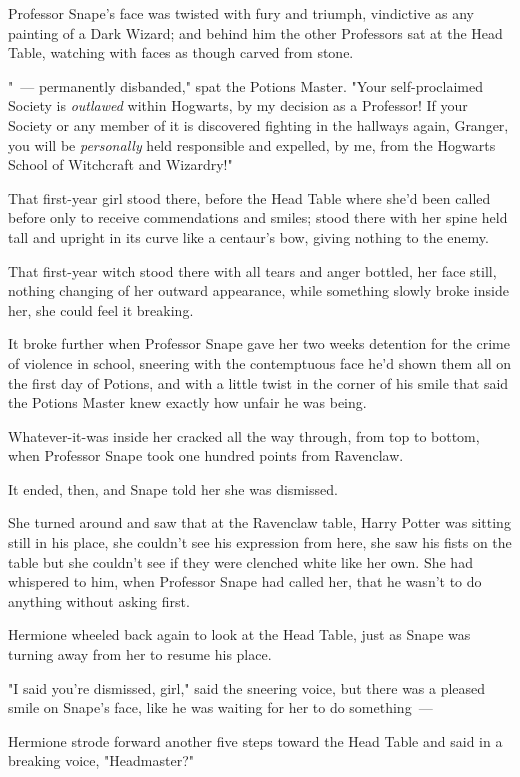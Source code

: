Professor Snape's face was twisted with fury and triumph, vindictive as any
painting of a Dark Wizard; and behind him the other Professors sat at the Head
Table, watching with faces as though carved from stone.

"~--- permanently disbanded," spat the Potions Master. "Your self-proclaimed
Society is \emph{outlawed} within Hogwarts, by my decision as a Professor! If
your Society or any member of it is discovered fighting in the hallways again,
Granger, you will be \emph{personally} held responsible and expelled, by me,
from the Hogwarts School of Witchcraft and Wizardry!"

That first-year girl stood there, before the Head Table where she'd been called
before only to receive commendations and smiles; stood there with her spine
held tall and upright in its curve like a centaur's bow, giving nothing to the
enemy.

That first-year witch stood there with all tears and anger bottled, her face
still, nothing changing of her outward appearance, while something slowly broke
inside her, she could feel it breaking.

It broke further when Professor Snape gave her two weeks detention for the
crime of violence in school, sneering with the contemptuous face he'd shown
them all on the first day of Potions, and with a little twist in the corner of
his smile that said the Potions Master knew exactly how unfair he was being.

Whatever-it-was inside her cracked all the way through, from top to bottom,
when Professor Snape took one hundred points from Ravenclaw.

It ended, then, and Snape told her she was dismissed.

She turned around and saw that at the Ravenclaw table, Harry Potter was sitting
still in his place, she couldn't see his expression from here, she saw his
fists on the table but she couldn't see if they were clenched white like her
own. She had whispered to him, when Professor Snape had called her, that he
wasn't to do anything without asking first.

Hermione wheeled back again to look at the Head Table, just as Snape was
turning away from her to resume his place.

"I said you're dismissed, girl," said the sneering voice, but there was a
pleased smile on Snape's face, like he was waiting for her to do something~---

Hermione strode forward another five steps toward the Head Table and said in a
breaking voice, "Headmaster?"

